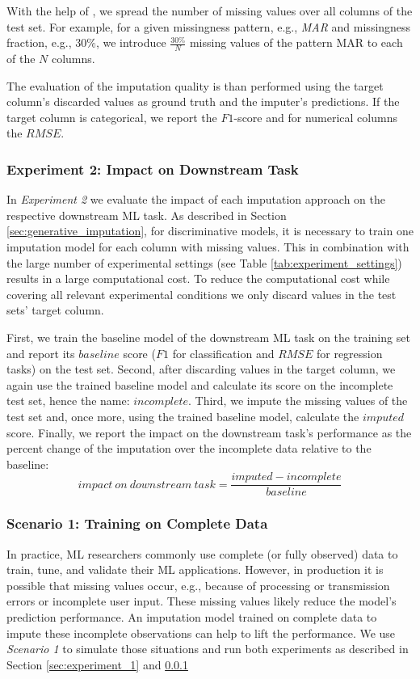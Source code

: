 With the help of , we spread the number of missing values over all columns of the test set. For example, for a given missingness pattern, e.g., \emph{MAR} and missingness fraction, e.g., $30\%$, we introduce $\frac{30\%}{N}$ missing values of the pattern MAR to each of the $N$ columns.

The evaluation of the imputation quality is than performed using the target column's discarded values as ground truth and the imputer's predictions. If the target column is categorical, we report the $F1$-score and for numerical columns the $RMSE$.


\subsubsection{Experiment 2: Impact on Downstream Task}
\label{sec:experiment_2}
%
In \emph{Experiment 2} we evaluate the impact of each imputation approach on the respective downstream ML task.
%
As described in Section \ref{sec:generative_imputation}, for discriminative models, it is necessary to train one imputation model for each column with missing values. This in combination with the large number of experimental settings (see Table \ref{tab:experiment_settings}) results in a large computational cost. To reduce the computational cost while covering all relevant experimental conditions we only discard values in the test sets' target column.

First, we train the baseline model of the downstream ML task on the training set and report its $baseline$ score ($F1$ for classification and $RMSE$ for regression tasks) on the test set. Second, after discarding values in the target column, we again use the trained baseline model and calculate its score on the incomplete test set, hence the name: $incomplete$. Third, we impute the missing values of the test set and, once more, using the trained baseline model, calculate the $imputed$ score. Finally, we report the impact on the downstream task's performance as the percent change of the imputation over the incomplete data relative to the baseline:
%
\begin{equation}
	impact\ on \ downstream\ task = \frac{imputed - incomplete}{baseline}
	\label{eq:impact}
\end{equation}
%



\subsubsection{Scenario 1: Training on Complete Data}
\label{sec:scenario_1}
%
In practice, ML researchers commonly use complete (or fully observed) data to train, tune, and validate their ML applications. However, in production it is possible that missing values occur, e.g., because of processing or transmission errors or incomplete user input. These missing values likely reduce the model's prediction performance. An imputation model trained on complete data to impute these incomplete observations can help to lift the performance. We use \emph{Scenario 1} to simulate those situations and run both experiments as described in Section \ref{sec:experiment_1} and \ref{sec:experiment_2}


